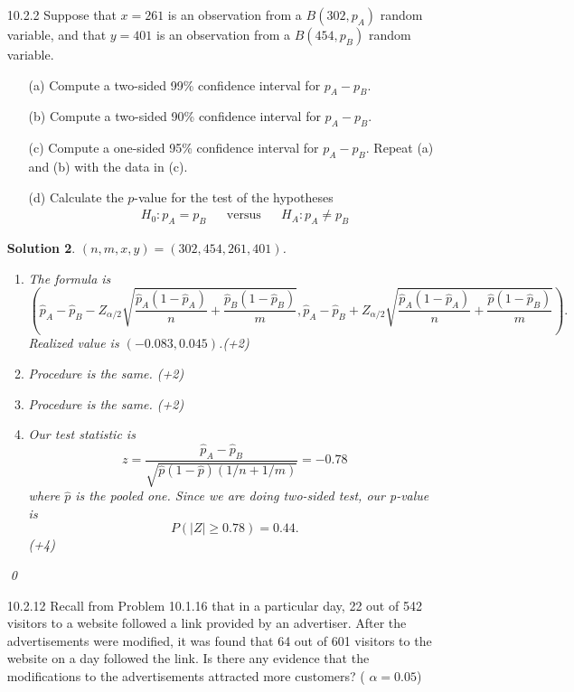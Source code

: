 \documentclass[a4paper,10pt]{article}
\newtheorem*{sol}{Solution}
\begin{document}
\begin{itemize}
\begin{sol}
	\qed
\end{sol}
\item [10.2.2] Suppose that $x = 261$ is an observation from a
$B(302, p_A)$ random variable, and that $y = 401$ is an
observation from a $B(454, p_B)$ random variable.
\begin{enumerate}
	\item [(a)] Compute a two-sided 99\% confidence interval for
	$p_A-p_B$.
	\item [(b)] Compute a two-sided 90\% confidence interval for
	$p_A-p_B$.
	\item [(c)]Compute a one-sided 95\% confidence interval for
	$p_A-p_B$. Repeat (a) and (b) with the data in (c). 
	\item [(d)]	Calculate the $p$-value for the test of the hypotheses		
	\begin{align*}
		&& H_{0}: p_A=p_B && \text{versus} && H_{A}:p_{A}\neq p_{B}
	\end{align*}
\end{enumerate}
\begin{sol}
	$(n, m, x, y) = (302, 454, 261, 401)$.
	\begin{enumerate}[label = (\alph*)]
		\item The formula is
			\[
				\left( \hat{p}_A - \hat{p}_B - Z_{\alpha/2}\sqrt{\frac{\hat{p}_A (1-\hat{p}_A)}{n} + \frac{\hat{p}_B(1-\hat{p}_B)}{m}}, \hat{p}_A - \hat{p}_B + Z_{\alpha/2}\sqrt{\frac{\hat{p}_A(1-\hat{p}_A)}{n}+ \frac{\hat{p}(1-\hat{p}_B)}{m}} \right).
			\]
			Realized value is $(-0.083, 0.045)$.(+2)

		\item Procedure is the same. (+2)

		\item Procedure is the same. (+2)

		\item Our test statistic is
			\[
				z = \frac{\hat{p}_A - \hat{p}_B}{\sqrt{\hat{p}(1-\hat{p})\left( 1/n + 1/m \right)}} = -0.78
			\]
			where $\hat{p}$ is the pooled one.
			Since we are doing two-sided test,
			our p-value is
			\[
				P(|Z| \ge 0.78) = 0.44.
			\](+4)
	\end{enumerate}

	\qed
\end{sol}
\item [10.2.12] Recall from Problem 10.1.16 that in a particular day, 22
out of 542 visitors to a website followed a link provided
by an advertiser. After the advertisements were
modified, it was found that 64 out of 601 visitors to the
website on a day followed the link. Is there any evidence
that the modifications to the advertisements attracted
more customers? ( $\alpha=0.05$)


\end{itemize}
\end{document}
